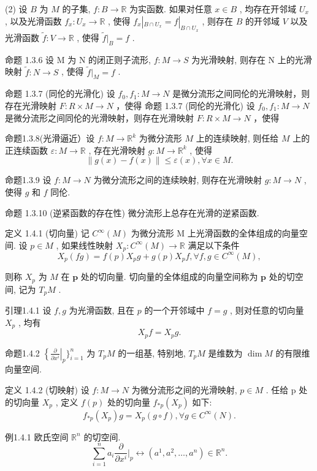\documentclass[]{article}
\begin{document}
(2) 设 $B$ 为 $M$ 的子集, $f: B \to \mathbb{R}$ 为实函数. 如果对任意 $x \in B$ , 均存在开邻域 $U_x$ , 以及光滑函数 $f_x: U_x \to \mathbb{R}$ , 使得 $f_x|_{B \cap U_x} = f|_{B \cap U_x}$ , 则存在 $B$ 的开邻域 $V$ 以及光滑函数 $\tilde{f}: V \to \mathbb{R}$ , 使得 $\tilde{f}|_B = f$ . 

命题 1.3.6 设 M 为 N 的闭正则子流形, $f: M \rightarrow S$ 为光滑映射, 则存在 N 上的光滑映射 $\tilde{f}: N \rightarrow S$ , 使得 $\tilde{f}|_{M} = f$ . 

命题 1.3.7 (同伦的光滑化) 设 $f_{0}, f_{1}: M \rightarrow N$ 是微分流形之间同伦的光滑映射，则存在光滑映射 $F: R \times M \rightarrow N$ ，使得 命题 1.3.7 (同伦的光滑化) 设 $f_{0}, f_{1}: M \rightarrow N$ 是微分流形之间同伦的光滑映射，则存在光滑映射 $F: R \times M \rightarrow N$ ，使得 

命题1.3.8(光滑逼近）设 $f:M\to \mathbb{R}^k$ 为微分流形 $M$ 上的连续映射, 则任给 $M$ 上的正连续函数 $\varepsilon :M\to \mathbb{R}$ , 存在光滑映射 $g:M\to \mathbb{R}^k$ , 使得 $$
\| g (x) - f (x) \| \leqslant \varepsilon (x), \forall x \in M.
$$

命题1.3.9 设 $f: M \to N$ 为微分流形之间的连续映射, 则存在光滑映射 $g: M \to N$ , 使得 $g$ 和 $f$ 同伦. 

命题 1.3.10 (逆紧函数的存在性) 微分流形上总存在光滑的逆紧函数. 

定义 1.4.1 (切向量) 记 $C^{\infty}(M)$ 为微分流形 M 上光滑函数的全体组成的向量空间. 设 $p \in M$ , 如果线性映射 $X_{p}: C^{\infty}(M) \to \mathbb{R}$ 满足以下条件 $$
X _ {p} (f g) = f (p) X _ {p} g + g (p) X _ {p} f, \forall f, g \in C ^ {\infty} (M),
$$

则称 $X_{p}$ 为 $M$ 在 $\pmb{p}$ 处的切向量. 切向量的全体组成的向量空间称为 $\pmb{p}$ 处的切空间, 记为 $T_{p}M$ . 

引理1.4.1 设 $f, g$ 为光滑函数, 且在 $p$ 的一个开邻域中 $f = g$ , 则对任意的切向量 $X_{p}$ , 均有 $$
X _ {p} f = X _ {p} g.
$$

命题1.4.2 $\left\{\frac{\partial}{\partial x^i}\right|_p\}_{i = 1}^n$ 为 $T_{p}M$ 的一组基, 特别地, $T_{p}M$ 是维数为 $\dim M$ 的有限维向量空间. 

定义 1.4.2 (切映射) 设 $f: M \to N$ 为微分流形之间的光滑映射, $p \in M$ . 任给 p 处的切向量 $X_{p}$ , 定义 $f(p)$ 处的切向量 $f_{*p}(X_{p})$ 如下: $$
f _ {* p} (X _ {p}) g = X _ {p} (g \circ f), \forall g \in C ^ {\infty} (N).
$$

例1.4.1 欧氏空间 $\mathbb{R}^n$ 的切空间. $$
\sum_ {i = 1} ^ {n} a _ {i} \frac {\partial}{\partial x ^ {i}} \big | _ {p} \longleftrightarrow (a ^ {1}, a ^ {2}, \dots , a ^ {n}) \in \mathbb {R} ^ {n}.
$$
\end{document}

